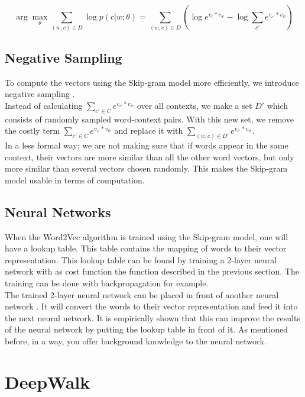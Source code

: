 \begin{equation} 
\arg \max_{\theta} \sum_{(w,c) \in D} \log p(c|w;\theta) = \sum_{(w,c) \in D} (\log e^{v_c * v_w} - \log \sum_{c'} e^{v_{c'}*v_w})
\end{equation}

\subsection{Negative Sampling}

To compute the vectors using the Skip-gram model more efficiently, we introduce negative sampling \cite{w2vExplained:article}. \\
Instead of calculating $\sum_{c' \in C}e^{v_{c'}*v_w}$ over all contexts, we make a set $D'$ which consists of randomly sampled word-context pairs. With this new set, we remove the costly term $\sum_{c' \in C}e^{v_{c'}*v_w}$ and replace it with $\sum_{(w,c) \in D'}e^{v_{c'}*v_w}$. \\

In a less formal way: we are not making sure that if words appear in the same context, their vectors are more similar than all the other word vectors, but only more similar than several vectors chosen randomly. This makes the Skip-gram model usable in terms of computation.


\subsection{Neural Networks}

When the Word2Vec algorithm is trained using the Skip-gram model, one will have a lookup table. This table contains the mapping of words to their vector representation. This lookup table can be found by training a 2-layer neural network with as cost function the function described in the previous section. The training can be done with backpropagation for example. \\
The trained 2-layer neural network can be placed in front of another neural network \cite{w2vNN:online}. It will convert the words to their vector representation and feed it into the next neural network. It is empirically shown that this can improve the results of the neural network by putting the lookup table in front of it. As mentioned before, in a way, you offer background knowledge to the neural network.

\section{DeepWalk}
\label{sec:deepwalk}

